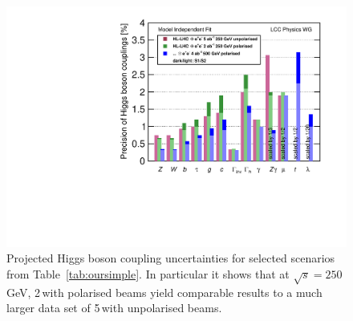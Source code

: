 \begin{figure}
\begin{center}
\includegraphics[width=0.7\hsize]{chapters/figures/DeltaHXX_SM_ILC_LEP_MI.pdf}
\caption{Projected Higgs boson coupling uncertainties for selected scenarios from Table~\ref{tab:oursimple}.
In particular it shows that at $\sqrt{s}=250$\,GeV, 2\,\iab  with polarised beams yield comparable results to a much larger data set of 5\,\iab with unpolarised beams.}
\label{fig:oursimple}
\end{center}
\end{figure}


